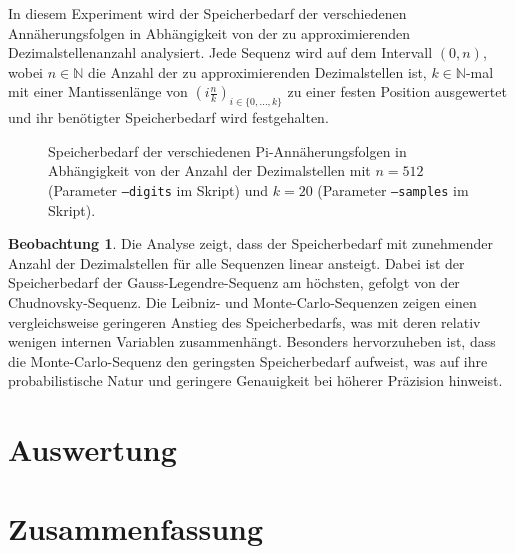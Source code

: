 \documentclass{scrartcl}
\theoremstyle{definition}
\newtheorem{approximation sequence}{Annäherungsfolge}
\newtheorem{observation}{Beobachtung}
\begin{document}
In diesem Experiment wird der Speicherbedarf der verschiedenen
Annäherungsfolgen in Abhängigkeit von der zu approximierenden
Dezimalstellenanzahl analysiert. Jede Sequenz wird auf dem Intervall \((0,
n)\), wobei \(n \in \mathbb{N}\) die Anzahl der zu approximierenden
Dezimalstellen ist, \(k \in \mathbb{N}\)-mal mit einer Mantissenlänge von \(\left(i
\frac{n}{k}\right)_{i \in \{0, \ldots, k\}}\) zu einer festen Position
ausgewertet und ihr benötigter Speicherbedarf wird festgehalten.

\begin{figure}[H]
    \centering
    
    \caption{
        Speicherbedarf der verschiedenen Pi-Annäherungsfolgen in Abhängigkeit
        von der Anzahl der Dezimalstellen mit \(n = 512\) (Parameter
        \texttt{--digits} im Skript) und \(k = 20\) (Parameter
        \texttt{--samples} im Skript).
    }
    \label{fig:memory-usage}
\end{figure}

\begin{observation}
    Die Analyse zeigt, dass der Speicherbedarf mit zunehmender Anzahl der
    Dezimalstellen für alle Sequenzen linear ansteigt. Dabei ist der
    Speicherbedarf der Gauss-Legendre-Sequenz am höchsten, gefolgt von der
    Chudnovsky-Sequenz. Die Leibniz- und Monte-Carlo-Sequenzen zeigen einen
    vergleichsweise geringeren Anstieg des Speicherbedarfs, was mit deren
    relativ wenigen internen Variablen zusammenhängt. Besonders hervorzuheben
    ist, dass die Monte-Carlo-Sequenz den geringsten Speicherbedarf aufweist,
    was auf ihre probabilistische Natur und geringere Genauigkeit bei höherer
    Präzision hinweist.
\end{observation}

\section{Auswertung}

\section{Zusammenfassung}

\printbibliography
\end{document}
